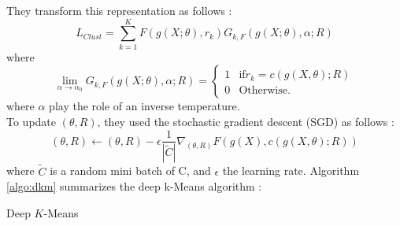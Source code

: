 They transform this representation as follows :
\begin{equation}
L_{Clust} = \sum_{k=1}^K F(g(X; \theta), r_k) G_{k, F}(g(X; \theta), \alpha; R)
\end{equation}
where
\begin{equation}
  \lim\limits_{\alpha \rightarrow \alpha_0}G_{k, F}(g(X; \theta), \alpha; R) = \left\{
\begin{array}{ll}
  1 & \mbox{if} r_k = c(g(X, \theta); R)\\
  0 & \mbox{Otherwise.}
\end{array}
\right.
\end{equation}
where $\alpha$ play the role of an inverse temperature.\\
To update $(\theta, R)$, they used the stochastic gradient descent (SGD)
as follows :
\begin{equation}
  (\theta, R) \gets (\theta, R) - \epsilon \frac{1}{|\widetilde{C}|}\nabla_{(\theta, R)} F(g(X),c(g(X, \theta); R))
\end{equation}
where $\widetilde{C}$ is a random mini batch of C, and $\epsilon$ the
learning rate.
Algorithm \ref{algo:dkm} summarizes the deep k-Means algorithm :
\begin{algorithm}[!h]
  \caption{\label{algo:dkm}Deep $K$-Means}
\end{algorithm}

